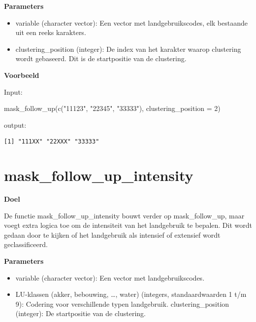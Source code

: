 \documentclass[twoside]{extreport}
\newenvironment{Shaded}{\begin{snugshade}}{\end{snugshade}}
\newcommand{\AttributeTok}[1]{\textcolor[rgb]{0.40,0.45,0.13}{#1}}
\newcommand{\DecValTok}[1]{\textcolor[rgb]{0.68,0.00,0.00}{#1}}
\newcommand{\FunctionTok}[1]{\textcolor[rgb]{0.28,0.35,0.67}{#1}}
\newcommand{\NormalTok}[1]{\textcolor[rgb]{0.00,0.23,0.31}{#1}}
\newcommand{\StringTok}[1]{\textcolor[rgb]{0.13,0.47,0.30}{#1}}
\providecommand{\tightlist}{%
  \setlength{\itemsep}{0pt}\setlength{\parskip}{0pt}}\usepackage{longtable,booktabs,array}
\begin{document}
\textbf{Parameters}

\begin{itemize}
\tightlist
\item
  variable (character vector): Een vector met landgebruikscodes, elk
  bestaande uit een reeks karakters.
\item
  clustering\_position (integer): De index van het karakter waarop
  clustering wordt gebaseerd. Dit is de startpositie van de clustering.
\end{itemize}

\textbf{Voorbeeld}

Input:

\begin{Shaded}
\begin{Highlighting}[]
\FunctionTok{mask\_follow\_up}\NormalTok{(}\FunctionTok{c}\NormalTok{(}\StringTok{"11123"}\NormalTok{, }\StringTok{"22345"}\NormalTok{, }\StringTok{"33333"}\NormalTok{), }\AttributeTok{clustering\_position =} \DecValTok{2}\NormalTok{)}
\end{Highlighting}
\end{Shaded}

output:

\begin{verbatim}
[1] "111XX" "22XXX" "33333"
\end{verbatim}

\section{mask\_follow\_up\_intensity}\label{mask_follow_up_intensity}

\textbf{Doel}

De functie mask\_follow\_up\_intensity bouwt verder op mask\_follow\_up,
maar voegt extra logica toe om de intensiteit van het landgebruik te
bepalen. Dit wordt gedaan door te kijken of het landgebruik als
intensief of extensief wordt geclassificeerd.

\textbf{Parameters}

\begin{itemize}
\tightlist
\item
  variable (character vector): Een vector met landgebruikscodes.
\item
  LU-klassen (akker, bebouwing, \ldots, water) (integers,
  standaardwaarden 1 t/m 9): Codering voor verschillende typen
  landgebruik. clustering\_position (integer): De startpositie van de
  clustering.
\end{itemize}
\end{document}
